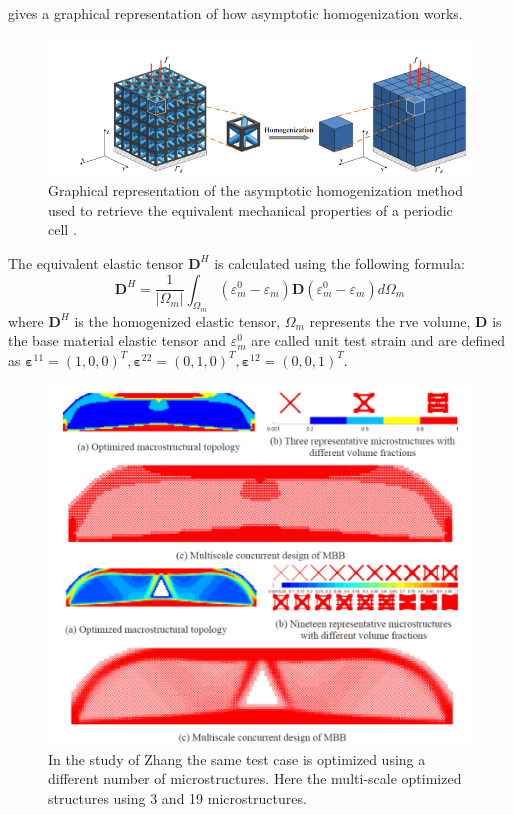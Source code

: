  gives a graphical representation of how asymptotic homogenization works.
\begin{figure}
    \centering
    \includegraphics[width=\linewidth]{figures/02_literature/homo.png}
    \caption{Graphical representation of the asymptotic homogenization method used to retrieve the equivalent mechanical properties of a periodic cell \cite{wang_concurrent_2020}.}
    \label{fig:02_homogen}
\end{figure}
The equivalent elastic tensor $\mathbf{D}^{H}$ is calculated using the following formula:
\begin{equation}
    \mathbf{D}^{H}=\frac{1}{\left|\Omega_{m}\right|} \int_{\Omega_{m}} \left(\varepsilon_{m}^{0}-\varepsilon_{m}\right)\mathbf{D}\left(\varepsilon_{m}^{0}-\varepsilon_{m}\right) d \Omega_{m}
\end{equation}
where $\mathbf{D}^{H}$ is the homogenized elastic tensor, $\Omega_{m}$ represents the \gls{rve} volume, $\mathbf{D}$ is the base material elastic tensor and $\varepsilon_{m}^{0}$ are called unit test strain and are defined as $\boldsymbol{\varepsilon}^{11}=(1,0,0)^{T}, \boldsymbol{\varepsilon}^{22}=(0,1,0)^{T}, \boldsymbol{\varepsilon}^{12}=(0,0,1)^{T}$.
\begin{figure}
    \centering
    \includegraphics[width=0.7\linewidth]{figures/02_literature/top_multiscale.png}
    \caption{In the study of Zhang \cite{zhang_multiscale_2018} the same test case is optimized using a different number of microstructures. Here the multi-scale optimized structures using 3 and 19 microstructures.}
    \label{fig:02_}
\end{figure}

